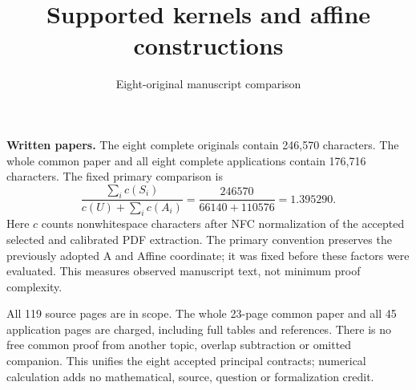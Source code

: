 \documentclass[11pt,a4paper]{article}
\title{Supported kernels and affine constructions}
\author{Eight-original manuscript comparison}\date{}
\begin{document}
\maketitle
\textbf{Written papers.} The eight complete originals contain 246,570 characters. The whole common paper and all eight complete applications contain 176,716 characters. The fixed primary comparison is
\[
 \frac{\sum_i c(S_i)}{c(U)+\sum_i c(A_i)}
 =\frac{246570}{66140+110576}
 =1.395290.
\]
Here $c$ counts nonwhitespace characters after NFC normalization of the accepted selected and calibrated PDF extraction. The primary convention preserves the previously adopted A and Affine coordinate; it was fixed before these factors were evaluated. This measures observed manuscript text, not minimum proof complexity.

All 119 source pages are in scope. The whole 23-page common paper and all 45 application pages are charged, including full tables and references. There is no free common proof from another topic, overlap subtraction or omitted companion. This unifies the eight accepted principal contracts; numerical calculation adds no mathematical, source, question or formalization credit.
\end{document}
